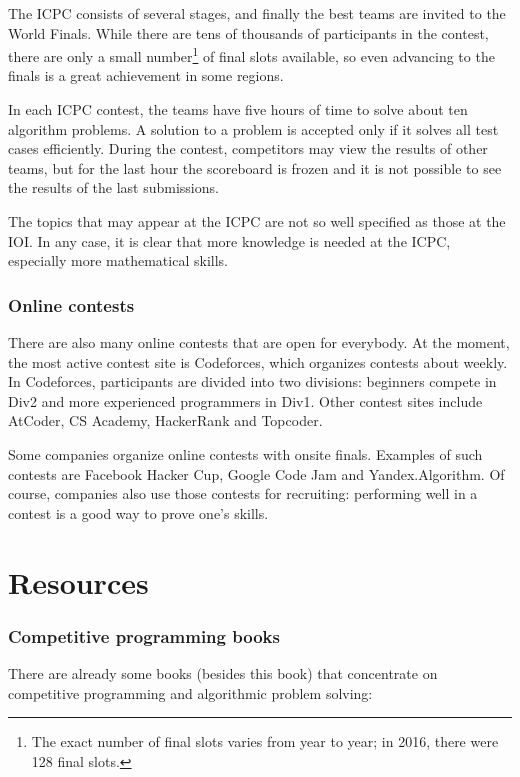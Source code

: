 The ICPC consists of several stages, and finally the
best teams are invited to the World Finals.
While there are tens of thousands of participants
in the contest, there are only a small number\footnote{The exact number of final
slots varies from year to year; in 2016, there were 128 final slots.} of final slots available,
so even advancing to the finals
is a great achievement in some regions.

In each ICPC contest, the teams have five hours of time to
solve about ten algorithm problems.
A solution to a problem is accepted only if it solves
all test cases efficiently.
During the contest, competitors may view the results of other teams,
but for the last hour the scoreboard is frozen and it
is not possible to see the results of the last submissions.

The topics that may appear at the ICPC are not so well
specified as those at the IOI.
In any case, it is clear that more knowledge is needed
at the ICPC, especially more mathematical skills.

\subsubsection{Online contests}

There are also many online contests that are open for everybody.
At the moment, the most active contest site is Codeforces,
which organizes contests about weekly.
In Codeforces, participants are divided into two divisions:
beginners compete in Div2 and more experienced programmers in Div1.
Other contest sites include AtCoder, CS Academy, HackerRank and Topcoder.

Some companies organize online contests with onsite finals.
Examples of such contests are Facebook Hacker Cup,
Google Code Jam and Yandex.Algorithm.
Of course, companies also use those contests for recruiting:
performing well in a contest is a good way to prove one's skills.

\section{Resources}

\subsubsection{Competitive programming books}

There are already some books (besides this book) that
concentrate on competitive programming and algorithmic problem solving:

